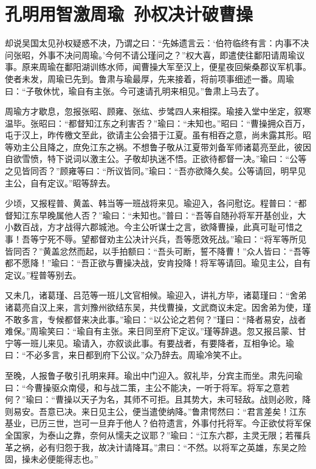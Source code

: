 \chapter{孔明用智激周瑜~孙权决计破曹操}

却说吴国太见孙权疑惑不决，乃谓之曰：“先姊遗言云：‘伯符临终有言：内事不决问张昭，外事不决问周瑜。’今何不请公瑾问之？”权大喜，即遣使往鄱阳请周瑜议事。原来周瑜在鄱阳湖训练水师，闻曹操大军至汉上，便星夜回柴桑郡议军机事。使者未发，周瑜已先到。鲁肃与瑜最厚，先来接着，将前项事细述一番。周瑜曰：“子敬休忧，瑜自有主张。今可速请孔明来相见。”鲁肃上马去了。

周瑜方才歇息，忽报张昭、顾雍、张纮、步骘四人来相探。瑜接入堂中坐定，叙寒温毕。张昭曰：“都督知江东之利害否？”瑜曰：“未知也。”昭曰：“曹操拥众百万，屯于汉上，昨传檄文至此，欲请主公会猎于江夏。虽有相吞之意，尚未露其形。昭等劝主公且降之，庶免江东之祸。不想鲁子敬从江夏带刘备军师诸葛亮至此，彼因自欲雪愤，特下说词以激主公。子敬却执迷不悟。正欲待都督一决。”瑜曰：“公等之见皆同否？”顾雍等曰：“所议皆同。”瑜曰：“吾亦欲降久矣。公等请回，明早见主公，自有定议。”昭等辞去。

少顷，又报程普、黄盖、韩当等一班战将来见。瑜迎入，各问慰讫。程普曰：“都督知江东早晚属他人否？”瑜曰：“未知也。”普曰：“吾等自随孙将军开基创业，大小数百战，方才战得六郡城池。今主公听谋士之言，欲降曹操，此真可耻可惜之事！吾等宁死不辱。望都督劝主公决计兴兵，吾等愿效死战。”瑜曰：“将军等所见皆同否？”黄盖忿然而起，以手拍额曰：“吾头可断，誓不降曹！”众人皆曰：“吾等都不愿降！”瑜曰：“吾正欲与曹操决战，安肯投降！将军等请回。瑜见主公，自有定议。”程普等别去。

又未几，诸葛瑾、吕范等一班儿文官相候。瑜迎入，讲礼方毕，诸葛瑾曰：“舍弟诸葛亮自汉上来，言刘豫州欲结东吴，共伐曹操，文武商议未定。因舍弟为使，瑾不敢多言，专候都督来决此事。”瑜曰：“以公论之若何？”瑾曰：“降者易安，战者难保。”周瑜笑曰：“瑜自有主张。来日同至府下定议。”瑾等辞退。忽又报吕蒙、甘宁等一班儿来见。瑜请入，亦叙谈此事。有要战者，有要降者，互相争论。瑜曰：“不必多言，来日都到府下公议。”众乃辞去。周瑜冷笑不止。

至晚，人报鲁子敬引孔明来拜。瑜出中门迎入。叙礼毕，分宾主而坐。肃先问瑜曰：“今曹操驱众南侵，和与战二策，主公不能决，一听于将军。将军之意若何？”瑜曰：“曹操以天子为名，其师不可拒。且其势大，未可轻敌。战则必败，降则易安。吾意已决。来日见主公，便当遣使纳降。”鲁肃愕然曰：“君言差矣！江东基业，已历三世，岂可一旦弃于他人？伯符遗言，外事付托将军。今正欲仗将军保全国家，为泰山之靠，奈何从懦夫之议耶？”瑜曰：“江东六郡，主灵无限；若罹兵革之祸，必有归怨于我，故决计请降耳。”肃曰：“不然。以将军之英雄，东吴之险固，操未必便能得志也。”


